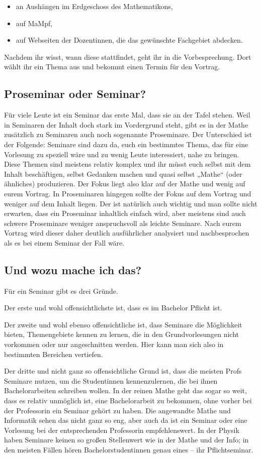 \begin{itemize}
	\item an Aushängen im Erdgeschoss des Mathematikons,
	\item auf MaMpf,
	\item auf Webseiten der Dozentinnen, die das gewünschte Fachgebiet abdecken.
\end{itemize}

Nachdem ihr wisst, wann diese stattfindet, geht ihr in die Vorbesprechung. Dort wählt ihr ein Thema aus und bekommt einen Termin für den Vortrag.

\subsection{Proseminar oder Seminar?}
Für viele Leute ist ein Seminar das erste Mal, dass sie an der Tafel stehen. Weil in Seminaren der Inhalt doch stark im Vordergrund steht, gibt es in der Mathe zusätzlich zu Seminaren auch noch sogenannte Proseminare. Der Unterschied ist der Folgende: Seminare sind dazu da, euch ein bestimmtes Thema, das für eine Vorlesung zu speziell wäre und zu wenig Leute interessiert, nahe zu bringen. Diese Themen sind meistens relativ komplex und ihr müsst euch selbst mit dem Inhalt beschäftigen, selbst Gedanken machen und quasi selbst „Mathe“ (oder ähnliches) produzieren. Der Fokus liegt also klar auf der Mathe und wenig auf eurem Vortrag. In Proseminaren hingegen sollte der Fokus auf dem Vortrag und weniger auf dem Inhalt liegen. Der ist natürlich auch wichtig und man sollte nicht erwarten, dass ein Proseminar inhaltlich einfach wird, aber meistens sind auch schwere Proseminare weniger anspruchsvoll als leichte Seminare. Nach eurem Vortrag wird dieser daher deutlich ausführlicher analysiert und nachbesprochen als es bei einem Seminar der Fall wäre.

\subsection{Und wozu mache ich das?}
Für ein Seminar gibt es drei Gründe.

Der erste und wohl offensichtlichste ist, dass es im Bachelor Pflicht ist.

Der zweite und wohl ebenso offensichtliche ist, dass Seminare die Möglichkeit bieten, Themengebiete kennen zu lernen, die in den Grundvorlesungen nicht vorkommen oder nur angeschnitten werden. Hier kann man sich also in bestimmten Bereichen vertiefen.

Der dritte und nicht ganz so offensichtliche Grund ist, dass die meisten Profs Seminare nutzen, um die Studentinnen kennenzulernen, die bei ihnen Bachelorarbeiten schreiben wollen. In der reinen Mathe geht das sogar so weit, dass es relativ unmöglich ist, eine Bachelorarbeit zu bekommen, ohne vorher bei der Professorin ein Seminar gehört zu haben. Die angewandte Mathe und Informatik sehen das nicht ganz so eng, aber auch da ist ein Seminar oder eine Vorlesung bei der entsprechenden Professorin empfehlenswert. In der Physik haben Seminare keinen so großen Stellenwert wie in der Mathe und der Info; in den meisten Fällen hören Bachelorstudentinnen genau eines -- ihr Pflichtseminar.
